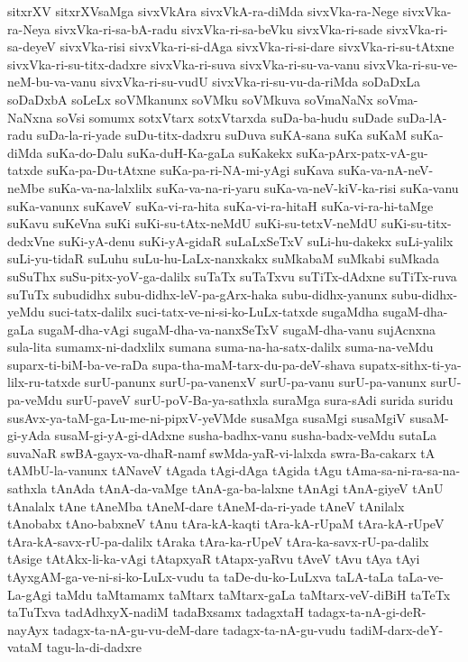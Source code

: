 {sitxrXV
sitxrXVsaMga
sivxVkAra
sivxVkA-ra-diMda
sivxVka-ra-Nege
sivxVka-ra-Neya
sivxVka-ri-sa-bA-radu
sivxVka-ri-sa-beVku
sivxVka-ri-sade
sivxVka-ri-sa-deyeV
sivxVka-risi
sivxVka-ri-si-dAga
sivxVka-ri-si-dare
sivxVka-ri-su-tAtxne
sivxVka-ri-su-titx-dadxre
sivxVka-ri-suva
sivxVka-ri-su-va-vanu
sivxVka-ri-su-ve-neM-bu-va-vanu
sivxVka-ri-su-vudU
sivxVka-ri-su-vu-da-riMda
soDaDxLa
soDaDxbA
soLeLx
soVMkanunx
soVMku
soVMkuva
soVmaNaNx
soVma-NaNxna
soVsi
somumx
sotxVtarx
sotxVtarxda
suDa-ba-hudu
suDade
suDa-lA-radu
suDa-la-ri-yade
suDu-titx-dadxru
suDuva
suKA-sana
suKa
suKaM
suKa-diMda
suKa-do-Dalu
suKa-duH-Ka-gaLa
suKakekx
suKa-pArx-patx-vA-gu-tatxde
suKa-pa-Du-tAtxne
suKa-pa-ri-NA-mi-yAgi
suKava
suKa-va-nA-neV-neMbe
suKa-va-na-lalxlilx
suKa-va-na-ri-yaru
suKa-va-neV-kiV-ka-risi
suKa-vanu
suKa-vanunx
suKaveV
suKa-vi-ra-hita
suKa-vi-ra-hitaH
suKa-vi-ra-hi-taMge
suKavu
suKeVna
suKi
suKi-su-tAtx-neMdU
suKi-su-tetxV-neMdU
suKi-su-titx-dedxVne
suKi-yA-denu
suKi-yA-gidaR
suLaLxSeTxV
suLi-hu-dakekx
suLi-yalilx
suLi-yu-tidaR
suLuhu
suLu-hu-LaLx-nanxkakx
suMkabaM
suMkabi
suMkada
suSuThx
suSu-pitx-yoV-ga-dalilx
suTaTx
suTaTxvu
suTiTx-dAdxne
suTiTx-ruva
suTuTx
subudidhx
subu-didhx-leV-pa-gArx-haka
subu-didhx-yanunx
subu-didhx-yeMdu
suci-tatx-dalilx
suci-tatx-ve-ni-si-ko-LuLx-tatxde
sugaMdha
sugaM-dha-gaLa
sugaM-dha-vAgi
sugaM-dha-va-nanxSeTxV
sugaM-dha-vanu
sujAcnxna
sula-lita
sumamx-ni-dadxlilx
sumana
suma-na-ha-satx-dalilx
suma-na-veMdu
suparx-ti-biM-ba-ve-raDa
supa-tha-maM-tarx-du-pa-deV-shava
supatx-sithx-ti-ya-lilx-ru-tatxde
surU-panunx
surU-pa-vanenxV
surU-pa-vanu
surU-pa-vanunx
surU-pa-veMdu
surU-paveV
surU-poV-Ba-ya-sathxla
suraMga
sura-sAdi
surida
suridu
susAvx-ya-taM-ga-Lu-me-ni-pipxV-yeVMde
susaMga
susaMgi
susaMgiV
susaM-gi-yAda
susaM-gi-yA-gi-dAdxne
susha-badhx-vanu
susha-badx-veMdu
sutaLa
suvaNaR
swBA-gayx-va-dhaR-namf
swMda-yaR-vi-lalxda
swra-Ba-cakarx
tA
tAMbU-la-vanunx
tANaveV
tAgada
tAgi-dAga
tAgida
tAgu
tAma-sa-ni-ra-sa-na-sathxla
tAnAda
tAnA-da-vaMge
tAnA-ga-ba-lalxne
tAnAgi
tAnA-giyeV
tAnU
tAnalalx
tAne
tAneMba
tAneM-dare
tAneM-da-ri-yade
tAneV
tAnilalx
tAnobabx
tAno-babxneV
tAnu
tAra-kA-kaqti
tAra-kA-rUpaM
tAra-kA-rUpeV
tAra-kA-savx-rU-pa-dalilx
tAraka
tAra-ka-rUpeV
tAra-ka-savx-rU-pa-dalilx
tAsige
tAtAkx-li-ka-vAgi
tAtapxyaR
tAtapx-yaRvu
tAveV
tAvu
tAya
tAyi
tAyxgAM-ga-ve-ni-si-ko-LuLx-vudu
ta
taDe-du-ko-LuLxva
taLA-taLa
taLa-ve-La-gAgi
taMdu
taMtamamx
taMtarx
taMtarx-gaLa
taMtarx-veV-diBiH
taTeTx
taTuTxva
tadAdhxyX-nadiM
tadaBxsamx
tadagxtaH
tadagx-ta-nA-gi-deR-nayAyx
tadagx-ta-nA-gu-vu-deM-dare
tadagx-ta-nA-gu-vudu
tadiM-darx-deY-vataM
tagu-la-di-dadxre
}
